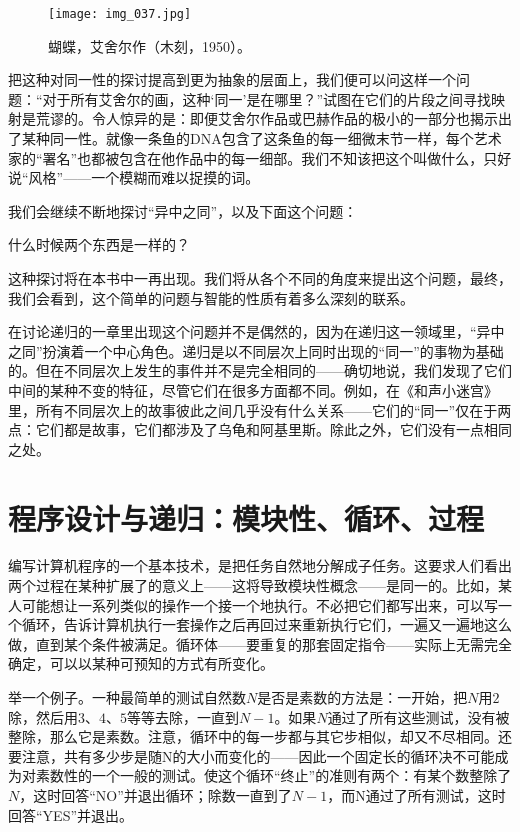 \begin{figure}
\texttt{[image: img\_037.jpg]}
\caption[蝴蝶，艾舍尔作。]
  {蝴蝶，艾舍尔作（木刻，1950）。}
\end{figure}

把这种对同一性的探讨提高到更为抽象的层面上，我们便可以问这样一个问题：“对于所有艾舍尔的画，这种‘同一’是在哪里？”试图在它们的片段之间寻找映射是荒谬的。令人惊异的是：即便艾舍尔作品或巴赫作品的极小的一部分也揭示出了某种同一性。就像一条鱼的DNA包含了这条鱼的每一细微末节一样，每个艺术家的“署名”也都被包含在他作品中的每一细部。我们不知该把这个叫做什么，只好说“风格”——一个模糊而难以捉摸的词。

我们会继续不断地探讨“异中之同”，以及下面这个问题：

\begin{block}
什么时候两个东西是一样的？
\end{block}
这种探讨将在本书中一再出现。我们将从各个不同的角度来提出这个问题，最终，我们会看到，这个简单的问题与智能的性质有着多么深刻的联系。

在讨论递归的一章里出现这个问题并不是偶然的，因为在递归这一领域里，“异中之同”扮演着一个中心角色。递归是以不同层次上同时出现的“同一”的事物为基础的。但在不同层次上发生的事件并不是完全相同的——确切地说，我们发现了它们中间的某种不变的特征，尽管它们在很多方面都不同。例如，在《和声小迷宫》里，所有不同层次上的故事彼此之间几乎没有什么关系——它们的“同一”仅在于两点：它们都是故事，它们都涉及了乌龟和阿基里斯。除此之外，它们没有一点相同之处。

\section{程序设计与递归：模块性、循环、过程}

编写计算机程序的一个基本技术，是把任务自然地分解成子任务。这要求人们看出两个过程在某种扩展了的意义上——这将导致模块性概念——是同一的。比如，某人可能想让一系列类似的操作一个接一个地执行。不必把它们都写出来，可以写一个循环，告诉计算机执行一套操作之后再回过来重新执行它们，一遍又一遍地这么做，直到某个条件被满足。循环体——要重复的那套固定指令——实际上无需完全确定，可以以某种可预知的方式有所变化。

举一个例子。一种最简单的测试自然数$N$是否是素数的方法是：一开始，把$N$用$2$除，然后用$3$、$4$、$5$等等去除，一直到$N-1$。如果$N$通过了所有这些测试，没有被整除，那么它是素数。注意，循环中的每一步都与其它步相似，却又不尽相同。还要注意，共有多少步是随N的大小而变化的——因此一个固定长的循环决不可能成为对素数性的一个一般的测试。使这个循环“终止”的准则有两个：有某个数整除了$N$，这时回答“NO”并退出循环；除数一直到了$N-1$，而N通过了所有测试，这时回答“YES”并退出。

